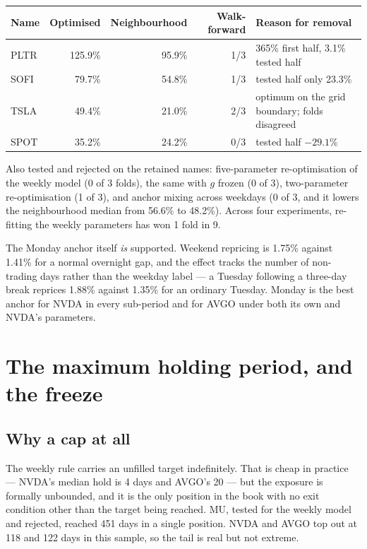 \documentclass[11pt]{article}
\begin{document}
\begin{table}[H]\centering\small
\begin{tabular}{lrrrl}
\toprule
\textbf{Name} & \textbf{Optimised} & \textbf{Neighbourhood} & \textbf{Walk-forward} &
\textbf{Reason for removal}\\
\midrule
\rowcolor{bcwarn} PLTR & 125.9\% & 95.9\% & 1/3 & 365\% first half, 3.1\% tested half\\
SOFI & 79.7\%  & 54.8\% & 1/3 & tested half only 23.3\%\\
\rowcolor{bcwarn} TSLA & 49.4\%  & 21.0\% & 2/3 & optimum on the grid boundary; folds disagreed\\
SPOT & 35.2\%  & 24.2\% & 0/3 & tested half $-29.1$\%\\
\bottomrule
\end{tabular}
\end{table}

Also tested and rejected on the retained names: five-parameter re-optimisation of the weekly model
(0 of 3 folds), the same with $g$ frozen (0 of 3), two-parameter re-optimisation (1 of 3), and
anchor mixing across weekdays (0 of 3, and it lowers the neighbourhood median from 56.6\% to
48.2\%). Across four experiments, re-fitting the weekly parameters has won 1 fold in 9.

The Monday anchor itself \emph{is} supported. Weekend repricing is 1.75\% against 1.41\% for a
normal overnight gap, and the effect tracks the number of non-trading days rather than the
weekday label --- a Tuesday following a three-day break reprices 1.88\% against 1.35\% for an
ordinary Tuesday. Monday is the best anchor for NVDA in every sub-period and for AVGO under both
its own and NVDA's parameters.

\section{The maximum holding period, and the freeze}

\subsection{Why a cap at all}

The weekly rule carries an unfilled target indefinitely. That is cheap in practice --- NVDA's
median hold is 4 days and AVGO's 20 --- but the exposure is formally unbounded, and it is the only
position in the book with no exit condition other than the target being reached. MU, tested for
the weekly model and rejected, reached 451 days in a single position. NVDA and AVGO top out at 118
and 122 days in this sample, so the tail is real but not extreme.
\end{document}
